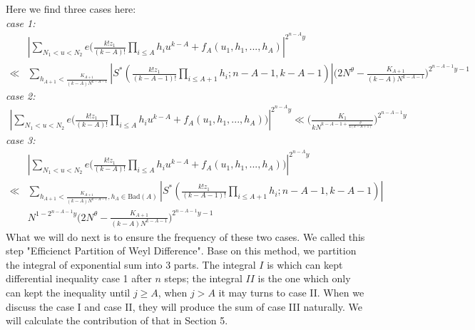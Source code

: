 \documentclass[10pt]{article}
\begin{document}
Here we find three cases here:\\
\emph{case 1:}
\begin{align*}
&|\sum\limits_{{N_1}<u<{N_2}}{e(\frac{k!z_1}{(k-A)!}\prod\limits_{i\leq A}h_iu^{k-A}+f_A({u_1,h_1,...,h_A})}|^{2^{n-A}y}\\
\ll&\sum\limits_{h_{A+1}<\frac{K_{A+1}}{(k-A)N^{k-A-1}}}|S^*(\frac{k!z_1}{(k-A-1)!}\prod\limits_{i\leq A+1}h_i;n-A-1,k-A-1)|\bigg(2N^\theta-\frac{K_{A+1}}{(k-A)N^{k-A-1}}\bigg)^{2^{n-A-1}y-1}
\end{align*}
\emph{case 2:}
\begin{align*}
|\sum\limits_{{N_1}<u<{N_2}}{e(\frac{k!z_1}{(k-A)!}\prod\limits_{i\leq A}h_iu^{k-A}+f_A({u_1,h_1,...,h_A})})|^{2^{n-A}y}
\ll\bigg(\frac{K_1}{kN^{k-A-1+\frac{\theta}{4(k-A+1)}}}\bigg)^{2^{n-A-1}y}
\end{align*}
\emph{case 3:}
\begin{align*}
&|\sum\limits_{{N_1}<u<{N_2}}{e(\frac{k!z_1}{(k-A)!}\prod\limits_{i\leq A}h_iu^{k-A}+f_A({u_1,h_1,...,h_A})})|^{2^{n-A}y}\\
\ll&\sum\limits_{h_{A+1}<\frac{K_{A+1}}{(k-A)N^{k-A-1}},h_A\in\text{Bad}(A)}|S^*(\frac{k!z_1}{(k-A-1)!}\prod\limits_{i\leq A+1}h_i;n-A-1,k-A-1)|\\
&N^{1-2^{n-A-1}y}\bigg(2N^\theta-\frac{K_{A+1}}{(k-A)N^{k-A-1}}\bigg)^{2^{n-A-1}y-1}
\end{align*}
What we will do next is to ensure the frequency of these two cases.
We called this step "Efficienct Partition of Weyl Difference". Base on this method, we partition the integral of exponential sum into 3 parts. The integral $I$ is which can kept differential inequality case 1 after $n$ steps; the integral $II$ is the one which only can kept the inequality until $j\geq A$, when $j>A$ it may turns to case II. When we discuss the case I and case II, they will produce the sum of case III naturally. We will calculate the contribution of that in Section 5.
\end{document}

